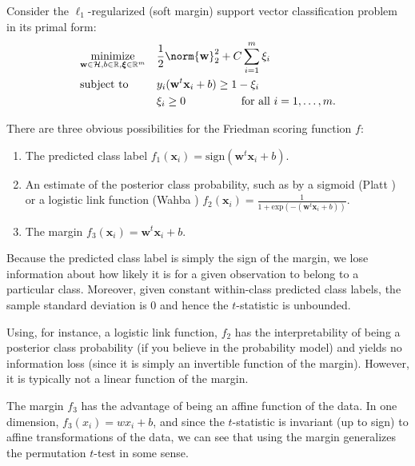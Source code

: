 Consider the $\ell_1$-regularized (soft margin) support vector classification
problem \cite{scholkopf2002learning} in its primal form:
\begin{equation}
\label{eq:l1-svm-primal}
\begin{aligned}
& \underset{\mathbf{w} \in \mathcal{H}, b \in \mathbb{R}, {\boldsymbol \xi} \in \mathbb{R}^m}{\text{minimize}}
& &\frac{1}{2}\norm{\mathbf{w}}_2^2+C\sum_{i=1}^m \xi_i \\
& \text{subject to}
& & y_i(\mathbf{w}^t \mathbf{x}_i + b) \geq 1 - \xi_i \\
&&& \xi_i \geq 0 \qquad \qquad \quad \text{for all } i=1,\ldots,m.
\end{aligned}
\end{equation}

There are three obvious possibilities for the Friedman scoring
function $f$:
\begin{enumerate}
\item The predicted class label $f_1(\mathbf{x}_i)
= \text{sign}(\mathbf{w}^t \mathbf{x}_i + b)$.
\item An estimate of the posterior class probability, such as by a
sigmoid (Platt \cite{platt1999probabilistic, lin2007note}) or a
logistic link function (Wahba \cite{wahba1992multivariate,
wahba1999support})
$f_2(\mathbf{x}_i) = \frac{1}{1 + \text{exp}(-(\mathbf{w}^t \mathbf{x}_i + b))}$.
\item The margin $f_3(\mathbf{x}_i) = \mathbf{w}^t \mathbf{x}_i + b$.
\end{enumerate}

Because the predicted class label is simply the sign of the margin, we
lose information about how likely it is for a given observation
to belong to a particular class.  Moreover, given constant within-class
predicted class labels, the sample standard deviation is $0$ and hence
the $t$-statistic is unbounded.

Using, for instance, a logistic link function, $f_2$ has the
interpretability of being a posterior class probability (if you
believe in the probability model) and yields no information loss
(since it is simply an invertible function of the margin).  However,
it is typically not a linear function of the margin.

The margin $f_3$ has the advantage of being an affine function of the
data.  In one dimension, $f_3(x_i) = w x_i + b$, and since the
$t$-statistic is invariant (up to sign) to affine transformations of
the data, we can see that using the margin generalizes the permutation
$t$-test in some sense.

